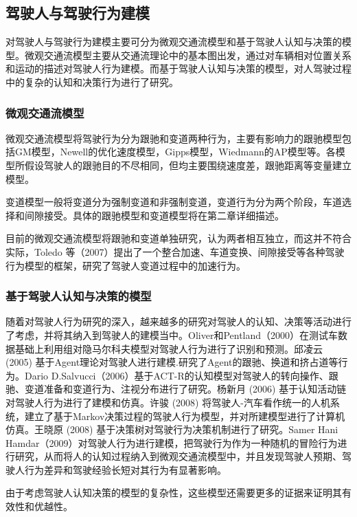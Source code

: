 \subsection{驾驶人与驾驶行为建模}
对驾驶人与驾驶行为建模主要可分为微观交通流模型和基于驾驶人认知与决策的模型。微观交通流模型主要从交通流理论中的基本图出发，通过对车辆相对位置关系和运动的描述对驾驶人行为建模。而基于驾驶人认知与决策的模型，对人驾驶过程中的复杂的认知和决策行为进行了研究。
\subsubsection{微观交通流模型}
微观交通流模型将驾驶行为分为跟驰和变道两种行为，主要有影响力的跟驰模型包括GM模型，Newell的优化速度模型，Gipps模型，Wiedmann的AP模型等。各模型所假设驾驶人的跟驰目的不尽相同，但均主要围绕速度差，跟驰距离等变量建立模型。

变道模型一般将变道分为强制变道和非强制变道，变道行为分为两个阶段，车道选择和间隙接受。具体的跟驰模型和变道模型将在第二章详细描述。

目前的微观交通流模型将跟驰和变道单独研究，认为两者相互独立，而这并不符合实际，Toledo 等（2007）提出了一个整合加速、车道变换、间隙接受等各种驾驶行为模型的框架，研究了驾驶人变道过程中的加速行为\cite{Toledo2007}。


\subsubsection{基于驾驶人认知与决策的模型}
随着对驾驶人行为研究的深入，越来越多的研究对驾驶人的认知、决策等活动进行了考虑，并将其纳入到驾驶人的建模当中。Oliver和Pentland（2000）在测试车数据基础上利用组对隐马尔科夫模型对驾驶人行为进行了识别和预测\cite{Oliver2000}。邱凌云 (2005) 基于Agent理论对驾驶人进行建模.研究了Agent的跟驰、换道和挤占道等行为\cite{邱凌云2005}。Dario D.Salvucci（2006）基于ACT-R的认知模型对驾驶人的转向操作、跟驰、变道准备和变道行为、注视分布进行了研究\cite{Salvucci2006}。杨新月 (2006) 基于认知活动链对驾驶人行为进行了建模和仿真\cite{杨新月2006}。许骏 (2008) 将驾驶人-汽车看作统一的人机系统，建立了基于Markov决策过程的驾驶人行为模型，并对所建模型进行了计算机仿真\cite{许骏2008}。王晓原 (2008) 基于决策树对驾驶行为决策机制进行了研究\cite{王晓原2008}。Samer Hani Hamdar（2009）对驾驶人行为进行建模，把驾驶行为作为一种随机的冒险行为进行研究，从而将人的认知过程纳入到微观交通流模型中，并且发现驾驶人预期、驾驶人行为差异和驾驶经验长短对其行为有显著影响\cite{Hamdar2009a}。

由于考虑驾驶人认知决策的模型的复杂性，这些模型还需要更多的证据来证明其有效性和优越性。


